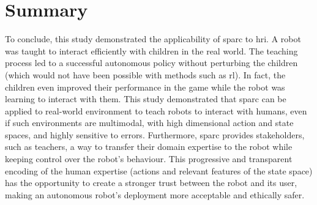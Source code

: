 \section{Summary}

%
%
%
%

To conclude, this study demonstrated the applicability of \gls{sparc} to \gls{hri}. A robot was taught to interact efficiently with children in the real world. The teaching process led to a successful autonomous policy without perturbing the children (which would not have been possible with methods such as \gls{rl}). In fact, the children even improved their performance in the game while the robot was learning to interact with them. This study demonstrated that \gls{sparc} can be applied to real-world environment to teach robots to interact with humans, even if such environments are multimodal, with high dimensional action and state spaces, and highly sensitive to errors. Furthermore, \gls{sparc} provides stakeholders, such as teachers, a way to transfer their domain expertise to the robot while keeping control over the robot's behaviour. This progressive and transparent encoding of the human expertise (actions and relevant features of the state space) has the opportunity to create a stronger trust between the robot and its user, making an autonomous robot's deployment more acceptable and ethically safer.


